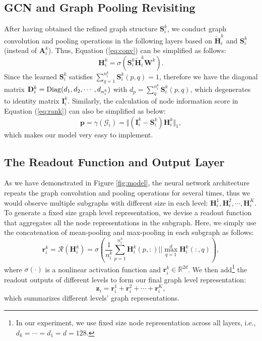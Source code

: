 \documentclass[letterpaper]{article} \usepackage{aaai20}  \usepackage{times}  \usepackage{helvet} \usepackage{courier}  \usepackage[hyphens]{url}  \usepackage{graphicx} \urlstyle{rm} \def\UrlFont{\rm}  \usepackage{graphicx}  \frenchspacing  \setlength{\pdfpagewidth}{8.5in}  \setlength{\pdfpageheight}{11in}
\begin{document}
\subsection{GCN and Graph Pooling Revisiting}
After having obtained the refined graph structure $\mathbf{S}_i^k$, we conduct graph convolution and pooling operations in the following layers based on $\tilde{\mathbf{H}}_i^k$ and $\mathbf{S}_i^k$ (instead of $\mathbf{A}_i^k$). Thus, Equation (\ref{eq:conv}) can be simplified as follows:
\begin{equation}
	\mathbf{H}_i^k=\sigma(\mathbf{S}_i^k\tilde{\mathbf{H}}_i^k\mathbf{W}^k).
\end{equation}
Since the learned $\mathbf{S}_i^k$ satisfies $\sum_{q=1}^{n_i^k}\mathbf{S}_i^k(p,q) = 1$, therefore we have the diagonal matrix $\mathbf{D}_i^k = {\rm Diag}(d_1,d_2,\cdots,d_{n_i^k})$ with $d_p = \sum_q^{n_i^k}{\mathbf{S}_i^k(p,q)}$, which degenerates to identity matrix $\mathbf{I}_i^k$. Similarly, the calculation of node information score in Equation (\ref{eq:rank}) can also be simplified as below:
\begin{equation}
	\mathbf{p} = \gamma(\mathcal{G}_i) = \Vert(\mathbf{I}_i^k - \mathbf{S}_i^k)\mathbf{H}_i^k\Vert_1,
\end{equation}
which makes our model very easy to implement.

\subsection{The Readout Function and Output Layer}
As we have demonstrated in Figure \ref{fig:model}, the neural network architecture repeats the graph convolution and pooling operations for several times, thus we would observe multiple subgraphs with different size in each level: $\mathbf{H}_i^1,\mathbf{H}_i^2,\cdots,\mathbf{H}_i^K$. To generate a fixed size graph level representation, we devise a readout function that aggregates all the node representations in the subgraph. Here, we simply use the concatenation of mean-pooling and max-pooling in each subgraph as follows:
\begin{equation}
	\mathbf{r}_i^k = \mathcal{R}(\mathbf{H}_i^k) = \sigma(\frac{1}{n_i^k}\sum_{p=1}^{n_i^k}\mathbf{H}_i^k(p,:)||\max_{q=1}^{d}\mathbf{H}_i^k(:,q)),
\end{equation}
where $\sigma(\cdot)$ is a nonlinear activation function and $\mathbf{r}_i^k \in \mathbb{R}^{2d}$. We then add\footnote{In our experiment, we use fixed size node representation across all layers, i.e., $d_{k} = \cdots = d_1 = d = 128$.} the readout outputs of different levels to form our final graph level representation:
\begin{equation}
	\mathbf{z}_i = \mathbf{r}_i^1 + \mathbf{r}_i^2 + \cdots + \mathbf{r}_i^K,
\end{equation}
which summarizes different levels' graph representations. 
\end{document}
